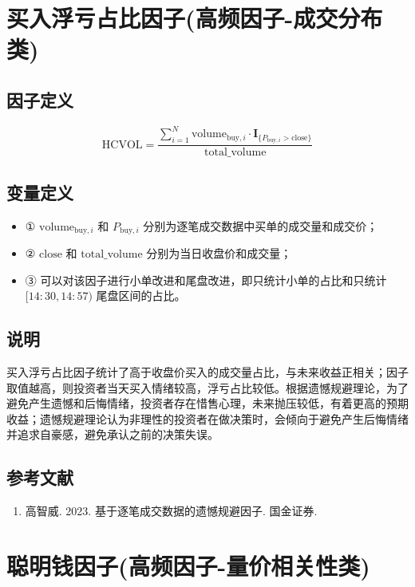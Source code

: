 \documentclass{article}
\begin{document}
\section{买入浮亏占比因子(高频因子-成交分布类)}

\subsection{因子定义}
\begin{equation}
    \mathrm{HCVOL} = \frac{\sum_{i=1}^{N} \mathrm{volume}_{\mathrm{buy},i} \cdot \mathbf{I}_{\{P_{\mathrm{buy},i} > \mathrm{close}\}}}{\mathrm{total\_volume}}
\end{equation}

\subsection{变量定义}
\begin{itemize}
    \item ① \( \mathrm{volume}_{\mathrm{buy},i} \) 和 \( P_{\mathrm{buy},i} \) 分别为逐笔成交数据中买单的成交量和成交价；
    \item ② \( \mathrm{close} \) 和 \( \mathrm{total\_volume} \) 分别为当日收盘价和成交量；
    \item ③ 可以对该因子进行小单改进和尾盘改进，即只统计小单的占比和只统计 \([14:30,14:57)\) 尾盘区间的占比。
\end{itemize}

\subsection{说明}
买入浮亏占比因子统计了高于收盘价买入的成交量占比，与未来收益正相关；因子取值越高，则投资者当天买入情绪较高，浮亏占比较低。根据遗憾规避理论，为了避免产生遗憾和后悔情绪，投资者存在惜售心理，未来抛压较低，有着更高的预期收益；遗憾规避理论认为非理性的投资者在做决策时，会倾向于避免产生后悔情绪并追求自豪感，避免承认之前的决策失误。

\subsection{参考文献}
\begin{enumerate}
    \item 高智威. 2023. 基于逐笔成交数据的遗憾规避因子. 国金证券.
\end{enumerate}

\section{聪明钱因子(高频因子-量价相关性类)}
\end{document}
